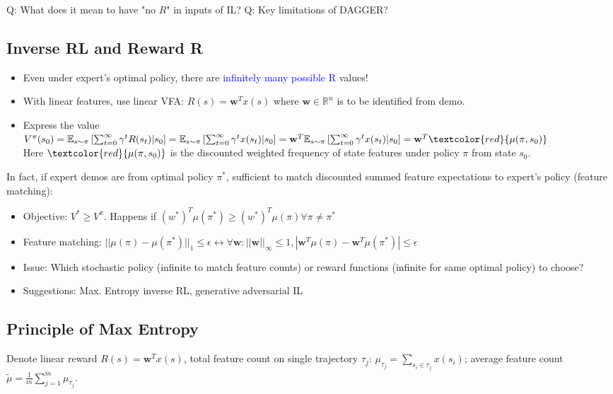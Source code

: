 \documentclass{article}
\begin{document}
\begin{hintbox}
    Q: What does it mean to have "no $R$" in inputs of IL?
    Q: Key limitations of DAGGER?
\end{hintbox}


\subsection{Inverse RL and Reward R}
\begin{itemize}
\item Even under expert's optimal policy, there are \textcolor{blue}{infinitely many possible R} values! 
\item With linear features, use linear VFA: $R(s) = \mathbf{w}^{T} x(s)$ where $\mathbf{w} \in \mathbb{R}^{n}$ is to be identified from demo.
\item Express the value 
    $V^{\pi}(s_0) = \mathbb{E}_{s \sim \pi} \left[ \sum_{t = 0}^{\infty} \gamma^{t} R(s_t) | s_0 \right]
    = \mathbb{E}_{s \sim \pi} \left[ \sum_{t = 0}^{\infty} \gamma^{t} x(s_t) | s_0 \right]
    = \mathbf{w}^{T} \mathbb{E}_{s \sim \pi} \left[ \sum_{t = 0}^{\infty} \gamma^{t} x(s_t) | s_0 \right]
    = \mathbf{w}^{T} \textcolor{red}{\mu(\pi, s_0)}$
    \\Here $\textcolor{red}{\mu(\pi, s_0)}$ is the discounted weighted frequency of state features under policy $\pi$ from state $s_0$.
\end{itemize}

In fact, if expert demos are from optimal policy $\pi^{*}$, sufficient to match discounted summed feature expectations to expert's policy (feature matching):
\begin{itemize}
\item Objective: $V^{*} \geq V^{\pi}$. Happens if $(w^{*})^{T} \mu(\pi^{*}) \geq (w^{*})^{T} \mu(\pi) \forall \pi \neq \pi^{*}$
\item Feature matching: $||\mu(\pi) - \mu(\pi^{*})||_{1} \leq \epsilon \leftrightarrow \forall \mathbf{w}: ||\mathbf{w}||_{\infty} \leq 1, |\mathbf{w}^{T} \mu(\pi) - \mathbf{w}^{T} \mu(\pi^{*})| \leq \epsilon$ 
\item Issue: Which stochastic policy (infinite to match feature counts) or reward functions (infinite for same optimal policy) to choose?
\item Suggestions: Max. Entropy inverse RL, generative adversarial IL
\end{itemize}

\subsection{Principle of Max Entropy}
Denote linear reward $R(s) = \mathbf{w}^{T} x(s)$, 
total feature count on single trajectory $\tau_{j}$: $\mu_{\tau_{j}} = \sum_{s_i \in \tau_{j}} x(s_i)$;
average feature count $\tilde{\mu} = \frac{1}{m} \sum_{j = 1}^{m} \mu_{\tau_{j}}$.
\end{document}

